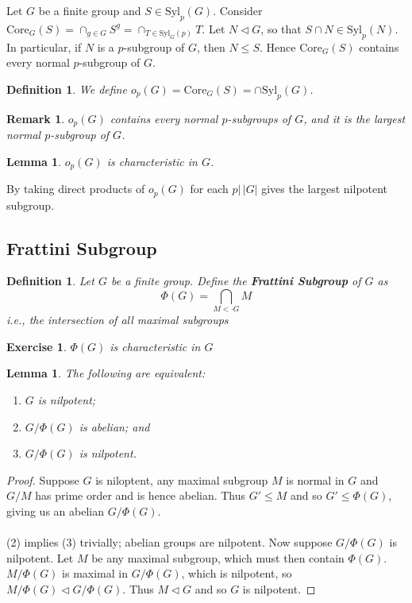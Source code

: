 \documentclass[a4paper,10pt]{article}
\newtheorem{Def}[thm]{Definition}
\newtheorem{Ex}[thm]{Exercise}
\newtheorem{Lem}[thm]{Lemma}
\newtheorem{rem}[thm]{Remark}
\begin{document}
Let $G$ be a finite group and $S \in \text{Syl}_p(G)$. Consider $\text{Core}_G(S) = \cap_{g \in G} S^g = \cap_{T \in \text{Syl}_G(p)} T$. Let $N \triangleleft G$, so that $S \cap N \in \text{Syl}_p(N)$. In particular, if $N$ is a $p$-subgroup of $G$, then $N \leq S$. Hence $\text{Core}_G(S)$ contains every normal $p$-subgroup of $G$. 

\begin{Def}
We define $o_p(G) = \text{Core}_G(S) = \cap \text{Syl}_p(G)$. 
\end{Def}

\begin{rem}
$o_p(G)$ contains every normal $p$-subgroups of $G$, and it is the largest normal $p$-subgroup of $G$. 
\end{rem}

\begin{Lem}
$o_p(G)$ is characteristic in $G$.
\end{Lem}

By taking direct products of $o_p(G)$ for each $p \big| \, |G|$ gives the largest nilpotent subgroup.

\subsection{Frattini Subgroup}

\begin{Def}
Let $G$ be a finite group. Define the \textbf{Frattini Subgroup} of $G$ as
\[ \Phi(G) = \bigcap_{M < \cdot G} M \]
i.e., the intersection of all maximal subgroups 
\end{Def}

\begin{Ex}
$\Phi(G)$ is characteristic in $G$
\end{Ex}

\begin{Lem}
The following are equivalent:
\begin{enumerate}
\item $G$ is nilpotent;
\item $G / \Phi(G)$ is abelian; and
\item $G / \Phi(G)$ is nilpotent.
\end{enumerate}
\end{Lem}

\begin{proof}
Suppose $G$ is niloptent, any maximal subgroup $M$ is normal in $G$ and $G / M$ has prime order and is hence abelian. Thus $G' \leq M$ and so $G' \leq \Phi(G)$, giving us an abelian $G / \Phi(G)$. \\
\\
(2) implies (3) trivially; abelian groups are nilpotent. Now suppose $G / \Phi(G)$ is nilpotent. Let $M$ be any maximal subgroup, which must then contain $\Phi(G)$. $M / \Phi(G)$ is maximal in $G / \Phi(G)$, which is nilpotent, so $M / \Phi(G) \triangleleft G / \Phi(G)$. Thus $M \triangleleft G$ and so $G$ is nilpotent. 
\end{proof}
\end{document}
